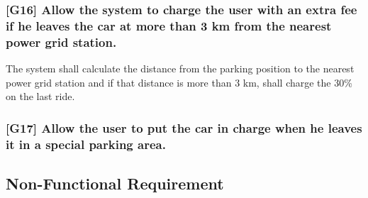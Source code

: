 \subsubsection{{[}G16{]} Allow the system to charge the user with an extra fee if he leaves the car at more than 3 km from the nearest power grid station.}
\begin{itemize}
	\reqcounter The system shall calculate the distance from the parking position to the nearest power grid station and if that distance is more than 3 km, shall charge the 30\% on the last ride. 
	
\end{itemize}


\subsubsection{{[}G17{]} Allow the user to put the car in charge when he leaves it in a special parking area.}

\subsection{Non-Functional Requirement}



